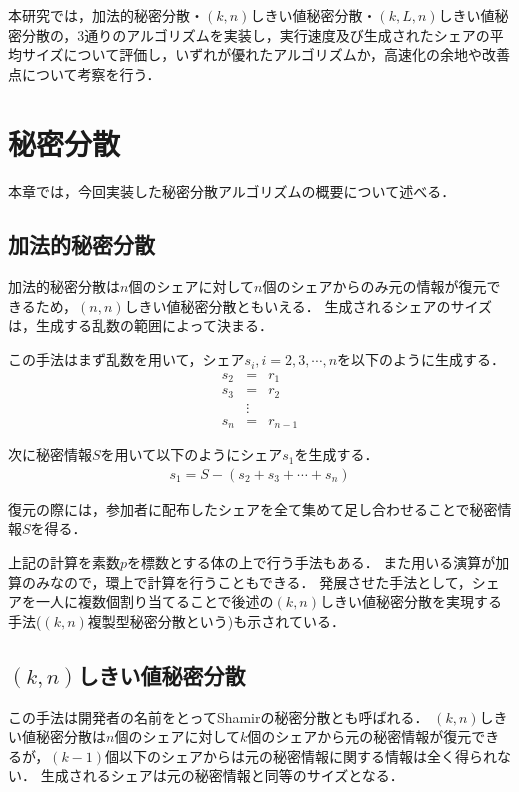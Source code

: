 \documentclass[10pt, a4paper, titlepage]{jsreport}
\begin{document}
	本研究では，加法的秘密分散\cite{oohara}・$(k,n)$しきい値秘密分散\cite{shamir}・$(k,L,n)$しきい値秘密分散\cite{yamamoto}\cite{multiparty}の，3通りのアルゴリズムを実装し，実行速度及び生成されたシェアの平均サイズについて評価し，いずれが優れたアルゴリズムか，高速化の余地や改善点について考察を行う．

	\chapter{秘密分散}
	本章では，今回実装した秘密分散アルゴリズムの概要について述べる．

	\section{加法的秘密分散\cite{oohara}}
	加法的秘密分散は$n$個のシェアに対して$n$個のシェアからのみ元の情報が復元できるため，$(n,n)$しきい値秘密分散ともいえる．
	生成されるシェアのサイズは，生成する乱数の範囲によって決まる．

	この手法はまず乱数を用いて，シェア$s_{i},i=2,3,{\cdots},n$を以下のように生成する．
	\begin{eqnarray*}
		s_{2}&=&r_{1} \\
		s_{3}&=&r_{2} \\
		&{\vdots}& \\
		s_{n}&=&r_{n-1}
	\end{eqnarray*}

	次に秘密情報$S$を用いて以下のようにシェア$s_{1}$を生成する．
	\begin{eqnarray*}
		s_{1}=S-(s_{2}+s_{3}+{\cdots}+s_{n})
	\end{eqnarray*}

	復元の際には，参加者に配布したシェアを全て集めて足し合わせることで秘密情報$S$を得る．

	上記の計算を素数$p$を標数とする体の上で行う手法もある．
	また用いる演算が加算のみなので，環上で計算を行うこともできる．
	発展させた手法として，シェアを一人に複数個割り当てることで後述の$(k,n)$しきい値秘密分散を実現する手法($(k,n)$複製型秘密分散という)も示されている．\cite{oohara}

	\section{$(k,n)$しきい値秘密分散\cite{shamir}}
	この手法は開発者の名前をとってShamirの秘密分散とも呼ばれる．
	$(k,n)$しきい値秘密分散は$n$個のシェアに対して$k$個のシェアから元の秘密情報が復元できるが，$(k-1)$個以下のシェアからは元の秘密情報に関する情報は全く得られない．
	生成されるシェアは元の秘密情報と同等のサイズとなる．
\end{document}
